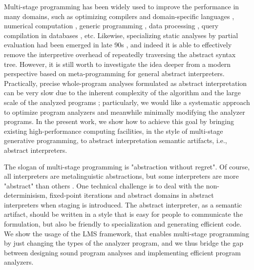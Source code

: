 Multi-stage programming has been widely used to improve the performance in many domains, 
such as optimizing compilers and domain-specific languages \cite{DBLP:conf/pldi/RompfSBLCO14, DBLP:conf/snapl/RompfBLSJAOSKDK15,
DBLP:journals/tecs/SujeethBLRCOO14, DBLP:conf/gpce/SujeethGBLROO13, DBLP:journals/jfp/CaretteKS09},
numerical computation \cite{PGL-038, DBLP:conf/pepm/AktemurKKS13}, 
generic programming \cite{DBLP:journals/pacmpl/Yallop17, Ofenbeck:2017:SGP:3136040.3136060}, 
data processing \cite{DBLP:conf/oopsla/JonnalageddaCSRO14, DBLP:conf/popl/KiselyovBPS17}, 
query compilation in databases \cite{DBLP:conf/osdi/EssertelTDBOR18, DBLP:conf/sigmod/TahboubER18},
etc.
Likewise, specializing static analyses by partial evaluation had been emerged in late 90s 
\cite{damian1999partial, amtoft1999partial, Boucher:1996:ACN:647473.727587, ashley:practical}, 
and indeed it is able to effectively remove the interpretive overhead of 
repeatedly traversing the abstract syntax tree. However, it is still worth 
to investigate the idea deeper from a modern perspective based on meta-programming 
for general abstract interpreters. 
Practically, precise whole-program analyses formulated as abstract interpretation 
can be very slow due to the inherent complexity of the algorithm and the large scale 
of the analyzed programs \cite{toman_et_al:LIPIcs:2017:7121} ;
particularly, we would like a systematic approach to optimize program 
analyzers and meanwhile minimally modifying the analyzer programs.
In the present work, we show how to achieve this goal by bringing existing 
high-performance computing facilities, in the style of multi-stage generative
programming, to abstract interpretation semantic artifacts, i.e., 
abstract interpreters. 


The slogan of multi-stage programming is "abstraction without regret". 
Of course, all interpreters are metalinguistic abstractions, but some interpreters are more "abstract"
than others . 
One technical challenge is to deal with the non-determinisism, fixed-point iterations and abstract 
domains in abstract interpreters when staging is introduced. The abstract interpreter, as a semantic artifact, 
should be written in a style that is easy for people to communicate the formulation, but also be friendly
to specialization and generating efficient code. 
We show the usage of the LMS framework, that enables multi-stage programming by just changing the types 
of the analyzer program, and we thus bridge the gap between designing sound program analyses 
and implementing efficient program analyzers. 

